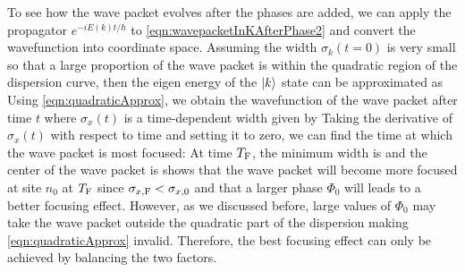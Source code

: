 To see how the wave packet evolves after the phases are added, we can apply the propagator $e^{-i E(k) t/\hbar}$ to 
\autoref{eqn:wavepacketInKAfterPhase2} and convert the wavefunction into coordinate space. Assuming the width
 $\sigma_k(t=0)$ is very small so that a large proportion of the wave packet is within the quadratic region of the
 dispersion curve, then the eigen energy of the $| k \rangle$ state can be approximated as
Using \autoref{eqn:quadraticApprox},
we obtain the wavefunction of the wave packet after time $t$
where $\sigma_{x}(t)$ is a time-dependent width given by
Taking the derivative of $\sigma_{x}(t)$ with respect to time and setting it to zero, we can find the time at which the
wave packet is most focused:
At time $T_{\rm F}$, the minimum width is
and the center of the wave packet is 
 shows that the wave packet will become more focused at site $n_0$ at $T_{\rm F}$ since $\sigma_{x, {\rm F}} < \sigma _{x, 0} $ and that a larger phase $\Phi_0$ will leads to a better focusing effect. However, as we 
discussed before, large values of $\Phi_0$ may take the wave packet outside the quadratic part of the dispersion
 making \autoref{eqn:quadraticApprox} invalid. Therefore, the best focusing effect can only be achieved by balancing
the two factors. 
